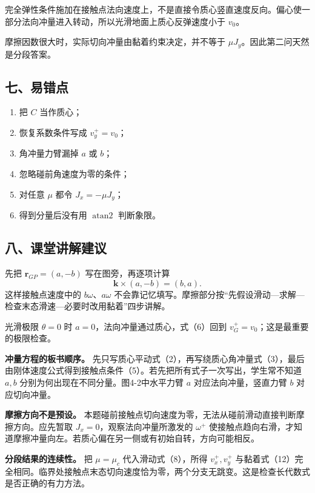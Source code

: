 \documentclass[12pt,a4paper,UTF8]{ctexart}
\newcommand{\tightlist}{\setlength{\itemsep}{0pt}\setlength{\parskip}{0pt}}
\begin{document}
完全弹性条件施加在接触点法向速度上，不是直接令质心竖直速度反向。偏心使一部分法向冲量进入转动，所以光滑地面上质心反弹速度小于
\(v_0\)。

摩擦因数很大时，实际切向冲量由黏着约束决定，并不等于
\(\mu J_y\)。因此第二问天然是分段答案。

\subsection{七、易错点}\label{ux4e03ux6613ux9519ux70b9-3}

\begin{enumerate}
\def\labelenumi{\arabic{enumi}.}
\tightlist
\item
  把 \(C\) 当作质心；
\item
  恢复系数条件写成 \(v_y^+=v_0\)；
\item
  角冲量力臂漏掉 \(a\) 或 \(b\)；
\item
  忽略碰前角速度为零的条件；
\item
  对任意 \(\mu\) 都令 \(J_x=-\mu J_y\)；
\item
  得到分量后没有用 \(\operatorname{atan2}\) 判断象限。
\end{enumerate}

\subsection{八、课堂讲解建议}\label{ux516bux8bfeux5802ux8bb2ux89e3ux5efaux8bae-3}

先把 \(\bm r_{GP}=(a,-b)\) 写在图旁，再逐项计算 \[
\bm k\times(a,-b)=(b,a).
\] 这样接触点速度中的 \(b\omega\)、\(a\omega\)
不会靠记忆填写。摩擦部分按``先假设滑动---求解---检查末态滑速---必要时改用黏着''四步讲解。

光滑极限 \(\theta=0\) 时 \(a=0\)，法向冲量通过质心，式（6）回到
\(v_G^+=v_0\)；这是最重要的极限检查。

\textbf{冲量方程的板书顺序。}
先只写质心平动式（2），再写绕质心角冲量式（3），最后由刚体速度公式得到接触点条件（5）。若先把所有式子一次写出，学生常不知道
\(a,b\) 分别为何出现在不同分量。图4-2中水平力臂 \(a\)
对应法向冲量，竖直力臂 \(b\) 对应切向冲量。

\textbf{摩擦方向不是预设。}
本题碰前接触点切向速度为零，无法从碰前滑动直接判断摩擦方向。应先暂取
\(J_x=0\)，观察法向冲量所激发的 \(\omega^+\)
使接触点趋向右滑，才知道摩擦冲量向左。若质心偏在另一侧或有初始自转，方向可能相反。

\textbf{分段结果的连续性。} 把 \(\mu=\mu_c\) 代入滑动式（8），所得
\(v_x^+,v_y^+\)
与黏着式（12）完全相同。临界处接触点末态切向速度恰为零，两个分支无跳变。这是检查长代数式是否正确的有力方法。
\end{document}
